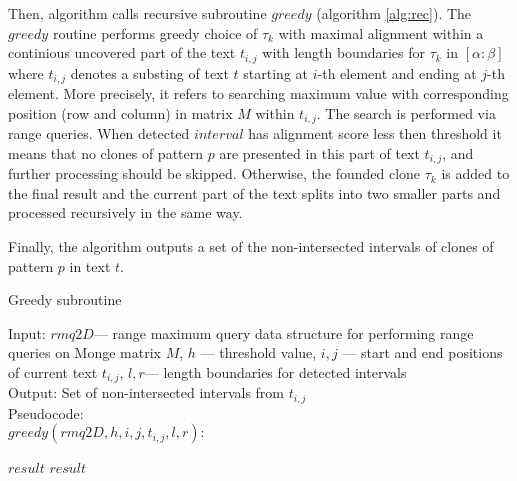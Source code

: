Then, algorithm calls recursive subroutine $greedy$ (algorithm \ref{alg:rec}).
The $greedy$ routine performs greedy choice of $\tau_{k}$ with maximal alignment within a continious uncovered part of the text $t_{i,j}$ with length boundaries for $\tau_{k}$ in $[\alpha:\beta]$ where $t_{i,j}$ denotes a substing of text $t$ starting at $i$-th element and ending at $j$-th element.
More precisely, it refers to searching maximum value with corresponding position (row and column) in matrix $M$ within $t_{i,j}$.
The search is performed via range queries.
When detected $interval$ has alignment score less then threshold it means that no clones of pattern $p$ are presented in this part of text $t_{i,j}$, and further processing should be skipped.
Otherwise, the founded clone $\tau_k$ is added to the final result and the current part of the text splits into two smaller parts and processed recursively in the same way.

Finally, the algorithm outputs a set of the non-intersected intervals of clones of pattern $p$ in text $t$.


\begin{algorithm}[H]
\caption{Greedy subroutine}
\label{alg:rec}
Input: $rmq2D$--- range maximum query data structure for performing range queries on Monge matrix $M$, $h$ --- threshold value, $i,j$ --- start and end positions of current text $t_{i,j}$, $l,r$--- length boundaries for detected intervals \\
Output: Set of non-intersected intervals from $t_{i,j}$\\
Pseudocode:\\
$greedy(rmq2D,h, i, j, t_{i,j},l,r ):$

\begin{algorithmic}[1]
\RETURN $result$
\ENDIF
{}
\ENDIF
{}
\ENDIF
\RETURN $result$
\end{algorithmic}
\end{algorithm}


